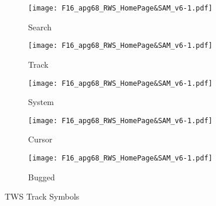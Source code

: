 \begin{figure}[htbp]
    \centering
    \begin{subfigure}[b]{0.15\linewidth}
        \centering
        \texttt{[image: F16\_apg68\_RWS\_HomePage\&SAM\_v6-1.pdf]}
        \caption{Search}
    \end{subfigure}
    \begin{subfigure}[b]{0.15\linewidth}
        \centering
        \texttt{[image: F16\_apg68\_RWS\_HomePage\&SAM\_v6-1.pdf]}
        \caption{Track}
    \end{subfigure}
    \begin{subfigure}[b]{0.15\linewidth}
        \centering
        \texttt{[image: F16\_apg68\_RWS\_HomePage\&SAM\_v6-1.pdf]}
        \caption{System}
    \end{subfigure}
    \begin{subfigure}[b]{0.15\linewidth}
        \centering
        \texttt{[image: F16\_apg68\_RWS\_HomePage\&SAM\_v6-1.pdf]}
        \caption{Cursor}
    \end{subfigure}
    \begin{subfigure}[b]{0.15\linewidth}
        \centering
        \texttt{[image: F16\_apg68\_RWS\_HomePage\&SAM\_v6-1.pdf]}
        \caption{Bugged}
    \end{subfigure}
    \caption{TWS Track Symbols}
\end{figure}
    
